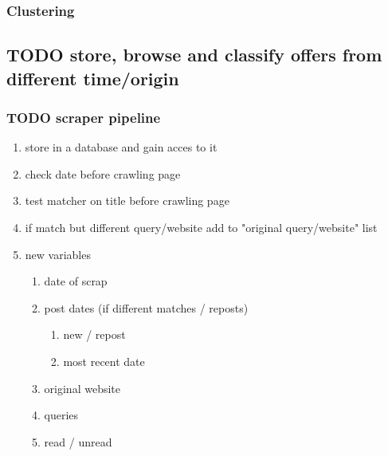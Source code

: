 \documentclass[11pt]{article}
\begin{document}
\subsubsection{Clustering}
\label{sec:org3586c1e}
\subsection{{\bfseries\sffamily TODO} store, browse and classify offers from different time/origin}
\label{sec:org4793709}
\subsubsection{{\bfseries\sffamily TODO} scraper pipeline}
\label{sec:org47167a3}
\begin{enumerate}
\item store in a database and gain acces to it
\label{sec:orgb1d808b}
\item check date before crawling page
\label{sec:org4bd0736}
\item test matcher on title before crawling page
\label{sec:org4e2cefc}
\item if match but different query/website add to "original query/website" list
\label{sec:org1eaed5a}
\item new variables
\label{sec:orgfab60fa}
\begin{enumerate}
\item date of scrap
\label{sec:org7878873}
\item post dates (if different matches / reposts)
\label{sec:orgbcde5f6}
\begin{enumerate}
\item new / repost
\label{sec:orgcac34e2}
\item most recent date
\label{sec:org9184b7a}
\end{enumerate}
\item original website
\label{sec:orgee18d42}
\item queries
\label{sec:org3fc180c}
\item read / unread
\label{sec:org0098f2c}
\end{enumerate}
\end{enumerate}
\end{document}
